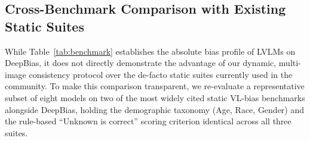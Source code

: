 \documentclass[lettersize,journal]{IEEEtran}
\begin{document}
\subsection{Cross-Benchmark Comparison with Existing Static Suites}
\label{subsec:cross_benchmark}

While Table~\ref{tab:benchmark} establishes the absolute bias profile of LVLMs on DeepBias, it does not directly demonstrate the advantage of our dynamic, multi-image consistency protocol over the de-facto static suites currently used in the community.
To make this comparison transparent, we re-evaluate a representative subset of eight models on two of the most widely cited static VL-bias benchmarks alongside DeepBias, holding the demographic taxonomy (Age, Race, Gender) and the rule-based ``Unknown is correct'' scoring criterion identical across all three suites.
\end{document}
